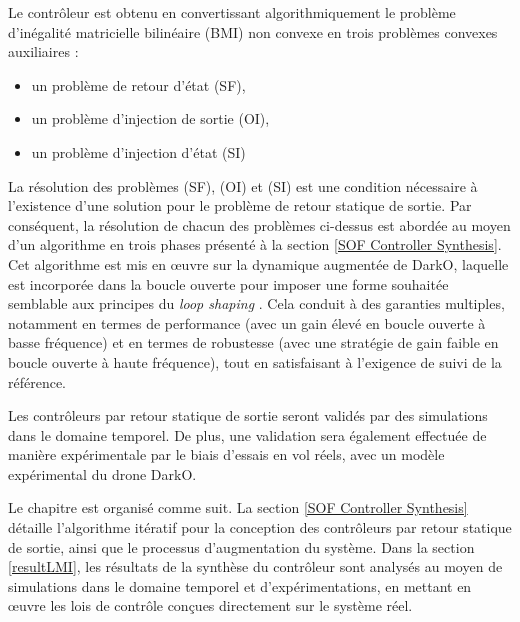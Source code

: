 Le contrôleur est obtenu en convertissant algorithmiquement le problème d'inégalité matricielle bilinéaire (BMI) non convexe en trois problèmes convexes auxiliaires :
\begin{itemize}
    \item un problème de retour d'état (SF),
    \item un problème d'injection de sortie (OI),
    \item un problème d'injection d'état (SI)
\end{itemize}



La résolution des problèmes (SF), (OI) et (SI) est une condition nécessaire à l'existence d'une solution pour le problème de retour statique de sortie. Par conséquent, la résolution de chacun des problèmes ci-dessus est abordée au moyen d'un algorithme en trois phases présenté à la section \ref{SOF Controller Synthesis}. Cet algorithme est mis en œuvre sur la dynamique augmentée de DarkO, laquelle est incorporée dans la boucle ouverte pour imposer une forme souhaitée semblable aux principes du \textit{loop shaping} \cite{McFarlane1992}. Cela conduit à des garanties multiples, notamment en termes de performance (avec un gain élevé en boucle ouverte à basse fréquence) et en termes de robustesse (avec une stratégie de gain faible en boucle ouverte à haute fréquence), tout en satisfaisant à l'exigence de suivi de la référence. 

Les contrôleurs par retour statique de sortie seront validés par des simulations dans le domaine temporel. De plus, une validation sera également effectuée de manière expérimentale par le biais d'essais en vol réels, avec un modèle expérimental du drone DarkO. 

Le chapitre est organisé comme suit. La section \ref{SOF Controller Synthesis} détaille l'algorithme itératif pour la conception des contrôleurs par retour statique de sortie, ainsi que le processus d'augmentation du système. Dans la section \ref{resultLMI}, les résultats de la synthèse du contrôleur sont analysés au moyen de simulations dans le domaine temporel et d'expérimentations, en mettant en œuvre les lois de contrôle conçues directement sur le système réel. 



